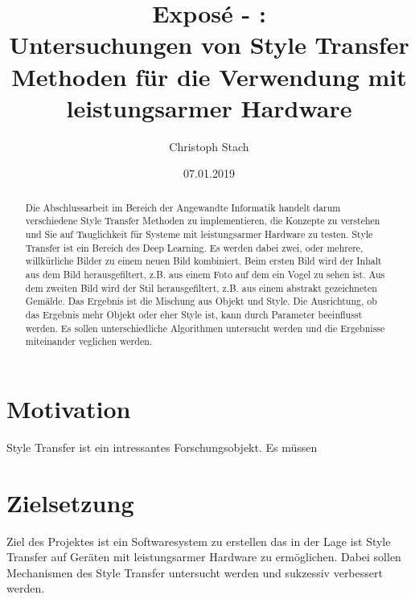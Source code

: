 


\title{\bf Exposé - \@exposeType:\protect\\ Untersuchungen von Style Transfer Methoden für die Verwendung mit leistungsarmer Hardware}
\author{Christoph Stach}
\date{07.01.2019}



\maketitle

\begin{otherlanguage}{ngerman}
	\begin{abstract}
		Die Abschlussarbeit im Bereich der Angewandte Informatik handelt darum verschiedene Style Transfer Methoden zu implementieren,
		die Konzepte zu verstehen und Sie auf Tauglichkeit für Systeme mit leistungsarmer Hardware zu testen. Style Transfer ist ein Bereich des 
		Deep Learning. Es werden dabei zwei, oder mehrere, willkürliche Bilder zu einem neuen Bild kombiniert. Beim ersten Bild wird der Inhalt aus
		dem Bild herausgefiltert, z.B. aus einem Foto auf dem ein Vogel zu sehen ist. Aus dem zweiten Bild wird der Stil herausgefiltert, 
		z.B. aus einem abstrakt gezeichneten Gemälde. Das Ergebnis ist die Mischung aus Objekt und Style. Die Ausrichtung, ob das Ergebnis mehr 
		Objekt oder eher Style ist, kann durch Parameter beeinflusst werden. Es sollen unterschiedliche Algorithmen untersucht werden und
		die Ergebnisse miteinander veglichen werden.
	\end{abstract}
\end{otherlanguage}

\pagebreak

\section{Motivation}
Style Transfer ist ein intressantes Forschungsobjekt. Es müssen 

\section{Zielsetzung}
Ziel des Projektes ist ein Softwaresystem zu erstellen das in der Lage ist
Style Transfer auf Geräten mit leistungsarmer Hardware zu ermöglichen. Dabei sollen Mechanismen des Style Transfer
untersucht werden und sukzessiv verbessert werden.

